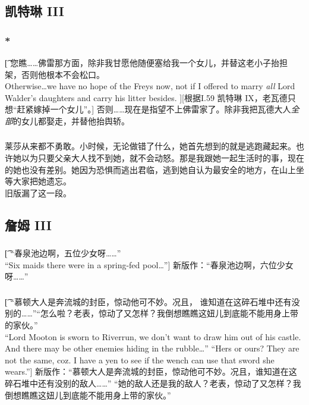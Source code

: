 \documentclass[12pt,a4paper]{article}
\newcommand{\h}[1]{{\color{red}#1}\\}
\begin{document}
\subsection{凯特琳 III}
\subsubsection{\color{red}*}\t[
	您瞧……佛雷那方面，除非我甘愿他随便塞给我一个女儿，并替这老小子抬担架，否则他根本不会松口。\\
	Otherwise\ldots we have no hope of the Freys now, not if I offered to marry \emph{all} Lord Walder's daughters and carry his litter besides. ][根据I.59 凯特琳 IX，老瓦德只想“赶紧嫁掉一个女儿”。]
	否则……现在是指望不上佛雷家了。除非我把瓦德大人\emph{全部}的女儿都娶走，并替他抬舆轿。
	
\subsubsection{}
	莱莎从来都不勇敢。小时候，无论做错了什么，她首先想到的就是逃跑藏起来。也许她以为只要父亲大人找不到她，就不会动怒。那是我跟她一起生活时的事，现在的她也没有差别。她因为恐惧而逃出君临，逃到她自认为最安全的地方，在山上坐等大家把她遗忘。\\
	\h{旧版漏了这一段。}
	
\subsection{詹姆 III}
\subsubsection{}\t[
	“春泉池边啊，五位少女呀……”\\
	“Six maids there were in a spring-fed pool\ldots”]
	新版作：“春泉池边啊，六位少女呀……”
	
\subsubsection{}\t[
	“慕顿大人是奔流城的封臣，惊动他可不妙。况且， 谁知道在这碎石堆中还有没别的……”“怎么啦？老表，惊动了又怎样？我倒想瞧瞧这妞儿到底能不能用身上带的家伙。”\\
	“Lord Mooton is sworn to Riverrun, we don't want to draw him out of his castle. And there may be other enemies hiding in the rubble\ldots”
	“Hers or ours? They are not the same, coz. I have a yen to see if the wench can use that sword she wears.”]
	新版作：“慕顿大人是奔流城的封臣，惊动他可不妙。况且，谁知道在这碎石堆中还有没别的敌人……”
	“她的敌人还是我的敌人？老表，惊动了又怎样？我倒想瞧瞧这妞儿到底能不能用身上带的家伙。”
\end{document}
